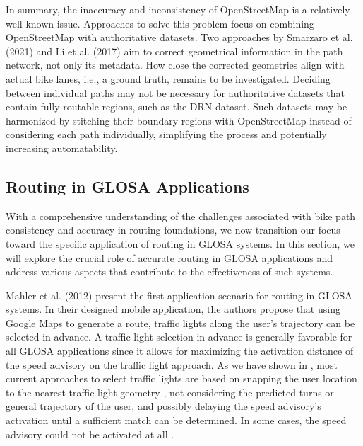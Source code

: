 In summary, the inaccuracy and inconsistency of OpenStreetMap is a relatively well-known issue. Approaches to solve this problem focus on combining OpenStreetMap with authoritative datasets. Two approaches by Smarzaro et al. (2021) \cite{smarzaro_creation_2021} and Li et al. (2017) \cite{li_optimized_2017} aim to correct geometrical information in the path network, not only its metadata. How close the corrected geometries align with actual bike lanes, i.e., a ground truth, remains to be investigated. Deciding between individual paths may not be necessary for authoritative datasets that contain fully routable regions, such as the DRN dataset. Such datasets may be harmonized by stitching their boundary regions with OpenStreetMap instead of considering each path individually, simplifying the process and potentially increasing automatability.

\subsection{Routing in GLOSA Applications}

With a comprehensive understanding of the challenges associated with bike path consistency and accuracy in routing foundations, we now transition our focus toward the specific application of routing in GLOSA systems. In this section, we will explore the crucial role of accurate routing in GLOSA applications and address various aspects that contribute to the effectiveness of such systems.

Mahler et al. (2012) \cite{mahler_reducing_2012} present the first application scenario for routing in GLOSA systems. In their designed mobile application, the authors propose that using Google Maps to generate a route, traffic lights along the user's trajectory can be selected in advance. A traffic light selection in advance is generally favorable for all GLOSA applications since it allows for maximizing the activation distance of the speed advisory on the traffic light approach. As we have shown in , most current approaches to select traffic lights are based on snapping the user location to the nearest traffic light geometry \cite{katsaros_performance_2011, bernais_design_2016, wilson_driver_2017, stahlmann_exploring_2018, bhattacharyya_assessing_2022}, not considering the predicted turns or general trajectory of the user, and possibly delaying the speed advisory's activation until a sufficient match can be determined. In some cases, the speed advisory could not be activated at all \cite{wilson_driver_2017, stahlmann_exploring_2018}. 

